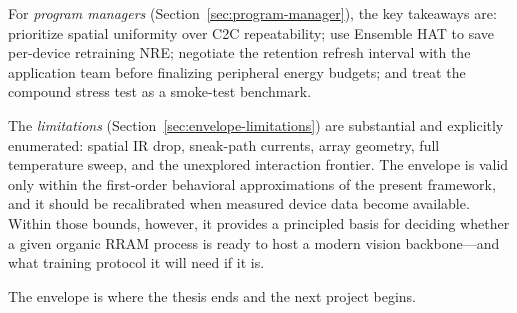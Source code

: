For \emph{program managers} (Section~\ref{sec:program-manager}), the key takeaways are: prioritize spatial uniformity over C2C repeatability; use Ensemble HAT to save per-device retraining NRE; negotiate the retention refresh interval with the application team before finalizing peripheral energy budgets; and treat the compound stress test as a smoke-test benchmark.

The \emph{limitations} (Section~\ref{sec:envelope-limitations}) are substantial and explicitly enumerated: spatial IR drop, sneak-path currents, array geometry, full temperature sweep, and the unexplored interaction frontier.  The envelope is valid only within the first-order behavioral approximations of the present framework, and it should be recalibrated when measured device data become available.  Within those bounds, however, it provides a principled basis for deciding whether a given organic RRAM process is ready to host a modern vision backbone---and what training protocol it will need if it is.

The envelope is where the thesis ends and the next project begins.
